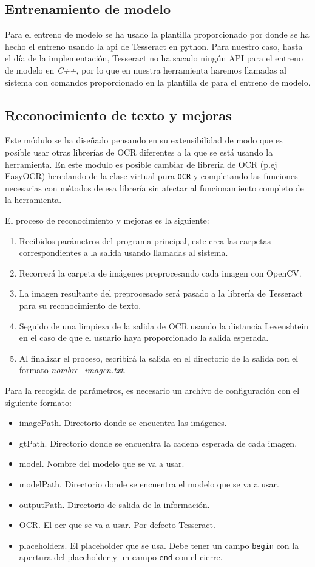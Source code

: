 \subsection{Entrenamiento de modelo}
Para el entreno de modelo se ha usado la plantilla proporcionado por \cite{Joseda} donde se ha hecho el entreno usando la api de Tesseract en python. Para nuestro caso, hasta el día de la implementación, Tesseract no ha sacado ningún API para el entreno de modelo en \emph{C++}, por lo que en nuestra herramienta haremos llamadas al sistema con comandos proporcionado en la plantilla de \cite{Joseda} para el entreno de modelo.
\subsection{Reconocimiento de texto y mejoras}
Este módulo se ha diseñado pensando en su extensibilidad de modo que es posible usar otras librerías de OCR diferentes a la que se está usando la herramienta.
En este modulo es posible cambiar de libreria de OCR (p.ej EasyOCR) heredando de la clase virtual pura \texttt{OCR} y completando las funciones necesarias con métodos de esa librería sin afectar al funcionamiento completo de la herramienta. 

El proceso de reconocimiento y mejoras es la siguiente:
\begin{enumerate}
	\item  Recibidos parámetros del programa principal, este crea las carpetas correspondientes a la salida usando llamadas al sistema.
	\item Recorrerá la carpeta de imágenes preprocesando cada imagen con OpenCV.
	\item La imagen resultante del preprocesado será pasado a la librería de Tesseract para su reconocimiento de texto.
	\item Seguido de una limpieza de la salida de OCR usando la distancia Levenshtein en el caso de que el usuario haya proporcionado la salida esperada.
	\item  Al finalizar el proceso, escribirá la salida en el directorio de la salida con el formato \emph{nombre\_imagen.txt}.
\end{enumerate}
 
Para la recogida de parámetros, es necesario un archivo de configuración con el siguiente formato:
\begin{itemize}
	\item imagePath. Directorio donde se encuentra las imágenes.
	\item gtPath. Directorio donde se encuentra la cadena esperada de cada imagen.
   	\item model. Nombre del modelo que se va a usar.
	\item modelPath. Directorio donde se encuentra el modelo que se va a usar.
	\item outputPath. Directorio de salida de la información.
	\item OCR. El ocr que se va a usar. Por defecto Tesseract.
	\item placeholders. El placeholder que se usa. Debe tener un campo \texttt{begin} con la apertura del placeholder y un campo \texttt{end} con el cierre.
\end{itemize}

